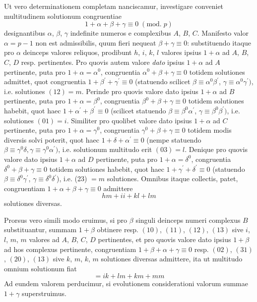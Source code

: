 \documentclass[twoside,12pt]{memoir}
\renewcommand{\pmod}[1]{\;(\textrm{mod.}\;#1)}
\begin{document}
Ut vero determinationem completam nanciscamur, investigare conveniet multitudinem solutionum congruentiae
\[1+\alpha+\beta+\gamma \equiv 0\pmod{p}\]
designantibus \(\alpha\), \(\beta\), \(\gamma\) indefinite numeros e complexibus \(A\), \(B\), \(C\). Manifesto valor \(\alpha=p-1\) non est admissibilis, quum fieri nequeat \(\beta+\gamma \equiv 0\): substituendo itaque pro \(\alpha\) deinceps valores reliquos, prodibunt \(h\), \(i\), \(k\), \(l\) valores ipsius \(1+\alpha\) ad \(A\), \(B\), \(C\), \(D\) resp. pertinentes. Pro quovis autem valore \textit{dato} ipsius \(1+\alpha\) ad \(A\) pertinente, puta pro \(1+\alpha=\alpha^{0}\), congruentia \(\alpha^{0}+\beta+\gamma \equiv 0\) totidem solutiones admittet, quot congruentia \(1+\beta^{\prime}+\gamma^{\prime} \equiv 0\) (statuendo scilicet \(\beta \equiv \alpha^{0} \beta^{\prime}\), \(\gamma \equiv \alpha^{0} \gamma^{\prime})\), i.e. solutiones \((12)=m\). Perinde pro quovis valore dato ipsius \(1+\alpha\) ad \(B\) pertinente, puta pro \(1+\alpha=\beta^{0}\), congruentia \(\beta^{0}+\beta+\gamma \equiv 0\) totidem solutiones habebit, quot haec \(1+\alpha^{\prime}+\beta^{\prime} \equiv 0\) (scilicet statuendo \(\beta \equiv \beta^{0} \alpha^{\prime}\), \(\gamma \equiv \beta^{0} \beta^{\prime})\), i.e. solutiones \((01)=i\). Similiter pro quolibet valore dato ipsius \(1+\alpha\) ad \(C\) pertinente, puta pro \(1+\alpha=\gamma^{0}\), congruentia \(\gamma^{0}+\beta+\gamma \equiv 0\) totidem modis diversis solvi poterit, quot haec \(1+\delta+\alpha^{\prime} \equiv 0\) (nempe statuendo \(\beta \equiv \gamma^{0} \delta, \gamma \equiv \gamma^{0} \alpha^{\prime})\), i.e. solutionum multitudo erit \((03)=l\). Denique pro quovis valore dato ipsius \(1+\alpha\) ad \(D\) pertinente, puta pro \(1+\alpha=\delta^{0}\), congruentia \(\delta^{0}+\beta+\gamma \equiv 0\) totidem solutiones habebit, quot haec \(1+\gamma^{\prime}+\delta^{\prime} \equiv 0\) (statuendo \(\beta \equiv \delta^{0} \gamma^{\prime}\), \(\gamma \equiv \delta^{0} \delta^{\prime}\)), i.e. (23) \(=m\) solutiones. Omnibus itaque collectis, patet, congruentiam \(1+\alpha+\beta+\gamma \equiv 0\) admittere
\[h m+i i+k l+l m\]
solutiones diversas.

Prorsus vero simili modo eruimus, si pro \(\beta\) singuli deinceps numeri complexus \(B\) substituantur, summam \(1+\beta\) obtinere resp. \((10)\), \((11)\), \((12)\), \((13)\) sive \(i\), \(l\), \(m\), \(m\) valores ad \(A\), \(B\), \(C\), \(D\) pertinentes, et pro quovis valore dato ipsius \(1+\beta\) ad hos complexus pertinente, congruentiam \(1+\beta+\alpha+\gamma \equiv 0\) resp. \((02)\), \((31)\), \((20)\), \((13)\) sive \(k\), \(m\), \(k\), \(m\) solutiones diversas admittere, ita ut multitudo omnium solutionum fiat\pagebreak%
\[=i k+l m+k m+m m\]
Ad eundem valorem perducimur, si evolutionem considerationi valorum summae \(1+\gamma\) superstruimus.
\end{document}

